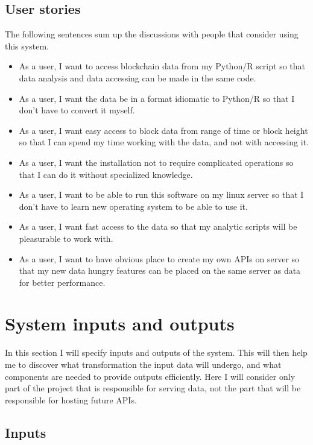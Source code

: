 \documentclass[12pt, en, eng, oneside]{mgr}
\begin{document}
\subsection{User stories}

The following sentences sum up the discussions with people that consider using this system.

\begin{itemize}
\item
As a user, I want to access blockchain data from my Python/R script so that data analysis and data accessing can be made in the same code.
\item
As a user, I want the data be in a format idiomatic to Python/R so that I don't have to convert it myself.
\item
As a user, I want easy access to block data from range of time or block height so that I can spend my time working with the data, and not with accessing it.
\item
As a user, I want the installation not to require complicated operations so that I can do it without specialized knowledge.
\item
As a user, I want to be able to run this software on my linux server so that I don't have to learn new operating system to be able to use it.
\item
As a user, I want fast access to the data so that my analytic scripts will be pleasurable to work with.
\item
As a user, I want to have obvious place to create my own APIs on server so that my new data hungry features can be placed on the same server as data for better performance.
\end{itemize}



\section{System inputs and outputs}

In this section I will specify inputs and outputs of the system. This will then help me to discover what transformation the input data will undergo, and what components are needed to provide outputs efficiently. Here I will consider only part of the project that is responsible for serving data, not the part that will be responsible for hosting future APIs.

\subsection{Inputs}
\end{document}
